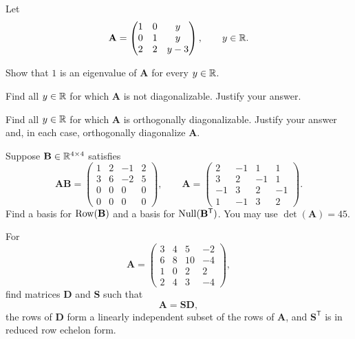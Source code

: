 \documentclass[11pt,oneside]{article}
\begin{document}
\begin{problem}
Let
\[
\mathbf A=
\begin{pmatrix}
1&0&y\\
0&1&y\\
2&2&y-3
\end{pmatrix},
\qquad y\in\mathbb{R}.
\]
\begin{problemsubparts}
\item Show that $1$ is an eigenvalue of $\mathbf A$ for every $y\in\mathbb{R}$.
\item Find all $y\in\mathbb{R}$ for which $\mathbf A$ is not diagonalizable. Justify your answer.
\item Find all $y\in\mathbb{R}$ for which $\mathbf A$ is orthogonally diagonalizable. Justify your answer and, in each case, orthogonally diagonalize $\mathbf A$.
\end{problemsubparts}
\end{problem}

\begin{problem}
Suppose $\mathbf B\in\mathbb{R}^{4\times4}$ satisfies
\[
\mathbf A\mathbf B=
\begin{pmatrix}
1&2&-1&2\\
3&6&-2&5\\
0&0&0&0\\
0&0&0&0
\end{pmatrix},
\qquad
\mathbf A=
\begin{pmatrix}
2&-1&1&1\\
3&2&-1&1\\
-1&3&2&-1\\
1&-1&3&2
\end{pmatrix}.
\]
Find a basis for $\operatorname{Row}(\mathbf B)$ and a basis for $\operatorname{Null}(\mathbf B^{\mathsf T})$. You may use $\det(\mathbf A)=45$.
\end{problem}

\begin{problem}
For
\[
\mathbf A=
\begin{pmatrix}
3&4&5&-2\\
6&8&10&-4\\
1&0&2&2\\
2&4&3&-4
\end{pmatrix},
\]
find matrices $\mathbf D$ and $\mathbf S$ such that
\[
\mathbf A=\mathbf S\mathbf D,
\]
the rows of $\mathbf D$ form a linearly independent subset of the rows of $\mathbf A$, and $\mathbf S^{\mathsf T}$ is in reduced row echelon form.
\end{problem}
\end{document}
